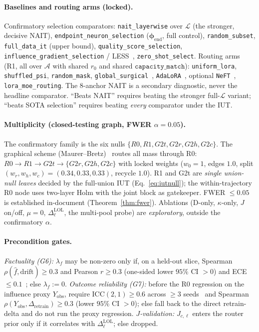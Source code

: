 \documentclass[11pt]{article}
\theoremstyle{definition}
\newcommand{\phend}{\bm{\phi}_{\mathrm{end}}}
\newcommand{\Aset}{\mathcal{A}}
\newcommand{\Lset}{\mathcal{L}}
\begin{document}
\paragraph{Baselines and routing arms (locked).}
Confirmatory selection comparators: \texttt{nait\_layerwise} over $\Lset$ (the stronger,
decisive NAIT), \texttt{endpoint\_neuron\_selection} ($\phend$, full control),
\texttt{random\_subset}, \texttt{full\_data\_it} (upper bound),
\texttt{quality\_score\_selection}, \texttt{influence\_gradient\_selection} /
LESS~\cite{xia2024less}, \texttt{zero\_shot\_select}. Routing arms (R1, all over $\Aset$ with
shared $r_0$ and shared $\texttt{capacity\_match}$): \texttt{uniform\_lora},
\texttt{shuffled\_psi}, \texttt{random\_mask}, \texttt{global\_surgical}~\cite{lee2023surgical},
\texttt{AdaLoRA}~\cite{zhang2023adalora}, optional \texttt{NeFT}~\cite{xu2024neft},
\texttt{lora\_moe\_routing}. The 8-anchor NAIT is a secondary diagnostic, never the headline
comparator. ``Beats NAIT'' requires beating the stronger full-$\Lset$ variant; ``beats SOTA
selection'' requires beating \emph{every} comparator under the IUT.

\paragraph{Multiplicity (closed-testing graph, FWER $\alpha=0.05$).}
The confirmatory family is the six nulls $\{R0,R1,G2t,G2r,G2h,G2c\}$. The graphical scheme
(Maurer--Bretz)~\cite{bretz2009graphical} routes all mass through R0:
$R0\to R1\to G2t\to\{G2r,G2h,G2c\}$ with locked weights ($w_0{=}1$, edges $1.0$, split
$(w_r,w_h,w_c){=}(0.34,0.33,0.33)$, recycle $1.0$). R1 and G2t are \emph{single union-null
leaves} decided by the full-union IUT (Eq.~\eqref{eq:iutnull}); the within-trajectory R0
node uses two-layer Holm with the joint block as gatekeeper. FWER $\le0.05$ is established
in-document (Theorem~\ref{thm:fwer}). Ablations (D-only, $\kappa$-only, $J$ on/off, $\mu{=}0$,
$\Delta_\ell^{\mathrm{LOL}}$, the multi-pool probe) are \emph{exploratory}, outside the
confirmatory $\alpha$.

\paragraph{Precondition gates.}
\emph{Factuality (G6):} $\lambda_f$ may be non-zero only if, on a held-out slice, Spearman
$\rho(\hat f,\text{drift})\ge0.3$ and Pearson $r\ge0.3$ (one-sided lower $95\%$ CI $>0$) and
ECE $\le0.1$~\cite{guo2017calibration}; else $\lambda_f:=0$. \emph{Outcome reliability
(G7):} before the R0 regression on the influence proxy $Y_{\mathrm{obs}}$, require
$\mathrm{ICC}(2,1)\ge0.6$ across $\ge3$ seeds~\cite{shrout1979intraclass} and Spearman
$\rho(Y_{\mathrm{obs}},\Delta_{\mathrm{retrain}})\ge0.3$ (lower $95\%$ CI $>0$); else fall
back to the direct retrain-delta and do not run the proxy regression. \emph{$J$-validation:}
$J_{c,\ell}$ enters the router prior only if it correlates with $\Delta_\ell^{\mathrm{LOL}}$;
else dropped.
\end{document}

